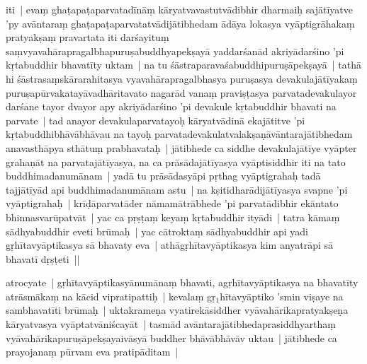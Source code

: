 \documentclass[article,12pt,a4paper]{memoir}%
\newcounter{parCount}
\begin{document}
	  
	  

	  \pstart \leavevmode%
	iti | evaṃ ghaṭapaṭaparvatadīnāṃ kāryatvavastutvādibhir dharmaiḥ sajātīyatve 'py avāntaraṃ ghaṭapaṭaparvatatvādijātibhedam ādāya lokasya vyāptigrāhakaṃ pratyakṣaṃ pravartata iti darśayituṃ saṃvyavahārapragalbhapuruṣabuddhyapekṣayā yaddarśanād akriyādarśino 'pi kṛtabuddhir bhavatīty uktam | na tu śāstraparavaśabuddhipuruṣāpekṣayā | tathā hi śāstrasaṃskārarahitasya vyavahārapragalbhasya puruṣasya devakulajātīyakaṃ puruṣapūrvakatayāvadhāritavato nagarād vanaṃ praviṣṭasya parvatadevakulayor darśane tayor dvayor apy akriyādarśino 'pi devakule kṛtabuddhir bhavati na parvate | tad anayor devakulaparvatayoḥ kāryatvādinā ekajātitve 'pi kṛtabuddhibhāvābhāvau na tayoḥ parvatadevakulatvalakṣaṇāvāntarajātibhedam anavasthāpya sthātuṃ prabhavataḥ | jātibhede ca siddhe devakulajātīye vyāpter grahaṇāt na parvatajātīyasya, na ca prāsādajātīyasya vyāptisiddhir iti na tato buddhimadanumānam | yadā tu prāsādasyāpi pṛthag vyāptigrahaḥ tadā tajjātīyād api buddhimadanumānam astu | na kṣitidharādijātīyasya svapne 'pi vyāptigrahaḥ | krīḍāparvatāder nāmamātrā\leavevmode{}\label{RNAms_30b}bhede 'pi parvatādibhir ekāntato bhinnasvarūpatvāt | \label{sarit__ratnakīrtinibandhāvali__146084}yac ca pṛṣṭaṃ keyaṃ kṛtabuddhir ityādi | tatra kāmaṃ sādhyabuddhir eveti brūmaḥ | yac cātroktaṃ sādhyabuddhir api yadi gṛhītavyāptikasya sā bhavaty eva | athāgṛhītavyāptikasya kim anyatrāpi sā bhavatī dṛṣṭeti ||
	{}
	\pend%
      

	  \pstart \leavevmode%
	\label{thakur75-53.23}atrocyate | gṛhītavyāptikasyānumānaṃ bhavati, agṛhītavyāptikasya na bhavatīty atrāsmākaṃ na kācid vipratipattiḥ | kevalaṃ gṛ{\tiny $_{1}$}hītavyāptiko 'smin viṣaye na sambhavatīti brūmaḥ |\label{sarit__ratnakīrtinibandhāvali__146582} uktakrameṇa vyatirekāsiddher vyāvahārikapratyakṣeṇa kāryatvasya vyāptatvāniścayāt | tasmād avāntarajātibhedaprasiddhyarthaṃ vyāvahārikapuruṣāpekṣayaivāsyā buddher bhāvābhāvāv uktau | jātibhede ca prayojanaṃ pūrvam eva pratipāditam |
	{}
	\pend%
      
\end{document}
